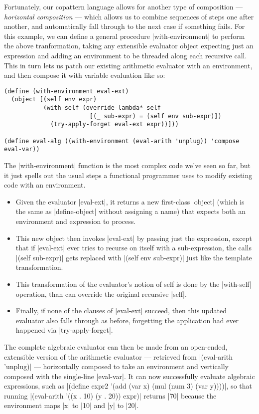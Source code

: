 Fortunately, our copattern language allows for another type of composition --- \emph{horizontal composition} --- which allows us to combine sequences of steps one after another, and automatically fall through to the next case if something fails.
For this example, we can define a general procedure \scm|with-environment| to perform the above tranformation, taking any extensible evaluator object expecting just an expression and adding an environment to be threaded along each recursive call.
This in turn lets us patch our existing arithmetic evaluator with an environment, and then compose it with variable evaluation like so:
\begin{verbatim}
(define (with-environment eval-ext)
  (object [(self env expr)
           (with-self (override-lambda* self
                        [(_ sub-expr) = (self env sub-expr)])
             (try-apply-forget eval-ext expr))]))

(define eval-alg ((with-environment (eval-arith 'unplug)) 'compose eval-var))
\end{verbatim}
The \scm|with-environment| function is the most complex code we've seen so far, but it just spells out the usual steps a functional programmer uses to modify existing code with an environment.
\begin{itemize}
\item Given the evaluator \scm|eval-ext|, it returns a new first-class \scm|object| (which is the same as \scm|define-object| without assigning a name) that expects both an environment and expression to process.
\item This new object then invokes \scm|eval-ext| by passing just the expression, except that if \scm|eval-ext| ever tries to recurse on itself with a sub-expression, the calls \scm|(self sub-expr)| gets replaced with \scm|(self env sub-expr)| just like the template transformation.
\item This transformation of the evaluator's notion of self is done by the \scm|with-self| operation, than can override the original recursive \scm|self|.
\item Finally, if none of the clauses of \scm|eval-ext| succeed, then this updated evaluator also falls through as before, forgetting the application had ever happened via \scm|try-apply-forget|.
\end{itemize}
The complete algebraic evaluator can then be made from an open-ended, extensible version of the arithmetic evaluator --- retrieved from \scm|(eval-arith 'unplug)| --- horizontally composed to take an environment and vertically composed with the single-line \scm|eval-var|.
It can now successfully evaluate algebraic expressions, such as \scm|(define expr2 '(add (var x) (mul (num 3) (var y))))|, so that running \scm|(eval-arith '((x . 10) (y . 20)) expr)| returns \scm|70| because the environment maps \scm|x| to \scm|10| and \scm|y| to \scm|20|.

